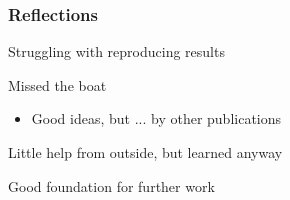 \documentclass{beamer}
\begin{document}
\begin{frame}
    \frametitle{Reflections}

    \begin{block}{Struggling with reproducing results}

    \end{block}

    \begin{block}{Missed the boat}
        \begin{itemize}
            \item Good ideas, but ... by other publications
        \end{itemize}
    \end{block}

    \begin{block}{}
        Little help from outside, but learned anyway

        Good foundation for further work
    \end{block}
\end{frame}
\end{document}
